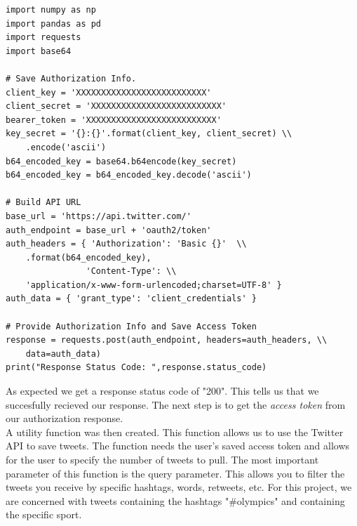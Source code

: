 \documentclass[12pt]{article}
\begin{document}
            \begin{lstlisting}[caption=Authorization]
import numpy as np
import pandas as pd
import requests 
import base64

# Save Authorization Info.
client_key = 'XXXXXXXXXXXXXXXXXXXXXXXXXX' 
client_secret = 'XXXXXXXXXXXXXXXXXXXXXXXXXX' 
bearer_token = 'XXXXXXXXXXXXXXXXXXXXXXXXXX' 
key_secret = '{}:{}'.format(client_key, client_secret) \\
    .encode('ascii')
b64_encoded_key = base64.b64encode(key_secret)
b64_encoded_key = b64_encoded_key.decode('ascii')

# Build API URL 
base_url = 'https://api.twitter.com/'
auth_endpoint = base_url + 'oauth2/token'
auth_headers = { 'Authorization': 'Basic {}'  \\
    .format(b64_encoded_key),
                'Content-Type': \\
    'application/x-www-form-urlencoded;charset=UTF-8' }
auth_data = { 'grant_type': 'client_credentials' }

# Provide Authorization Info and Save Access Token
response = requests.post(auth_endpoint, headers=auth_headers, \\
    data=auth_data)
print("Response Status Code: ",response.status_code)
            \end{lstlisting}

            As expected we get a response status code of "200". This tells us that we succesfully recieved our response. The next step is to get the \textit{access token} from our 
            authorization response. \\

            A utility function was then created. This function allows us to use the Twitter API to save tweets. The function needs the user's saved access token and allows for the user
            to specify the number of tweets to pull. The most important parameter of this function is the query parameter. This allows you to filter the tweets you receive by specific
            hashtags, words, retweets, etc. For this project, we are concerned with tweets containing the hashtags "\#olympics" and containing the specific sport. \\
\end{document}
